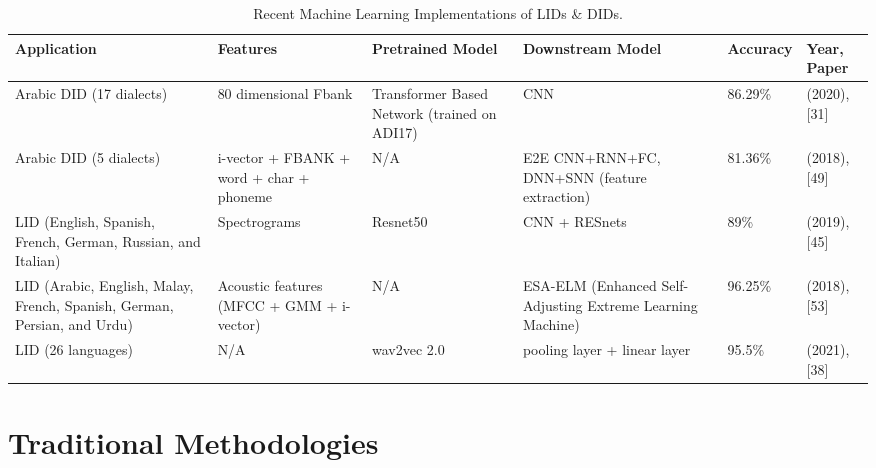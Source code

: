 \begin{table}[hbt!]
    \begin{center}
    \begin{tabular}{|m{3cm} | m{2.5cm} | m{2cm} |  m{3cm} |  m{1.7cm} | m{2cm} |}
        \hline
        \textbf{Application} & \textbf{Features} & \textbf{Pretrained Model} & \textbf{Downstream Model} &\textbf{Accuracy} &\textbf{Year, Paper}\\
        \hline
        Arabic DID \newline(17 dialects) & 80 dimensional Fbank & 
        Transformer Based Network (trained on ADI17) & CNN & 86.29\% & (2020), [31] \\
        \hline
        Arabic DID \newline(5 dialects) & i-vector + FBANK + \newline word + \newline char + \newline phoneme & 
        N/A & E2E CNN+RNN+FC, DNN+SNN (feature extraction) & 81.36\% & (2018), [49] \\
        \hline
        LID (English, Spanish, French, German, Russian, and Italian) & Spectrograms & 
        Resnet50 & CNN + RESnets & 89\% & (2019), [45]\\
        \hline
        LID (Arabic, English, Malay, French, Spanish, German, Persian, and Urdu) & 
        Acoustic features (MFCC + GMM + i-vector) & N/A & ESA-ELM (Enhanced Self- Adjusting Extreme Learning Machine) 
        & 96.25\% & (2018), [53]\\
        \hline
        LID \newline(26 languages) & N/A & wav2vec 2.0 & pooling layer + linear layer & 95.5\% & (2021), [38]\\
        \hline
    \end{tabular}
    \caption{Recent Machine Learning Implementations of LIDs \& DIDs.}
    \label{tab:MLapplications}
    \end{center}
\end{table}

\pagebreak
\section{Traditional Methodologies}
